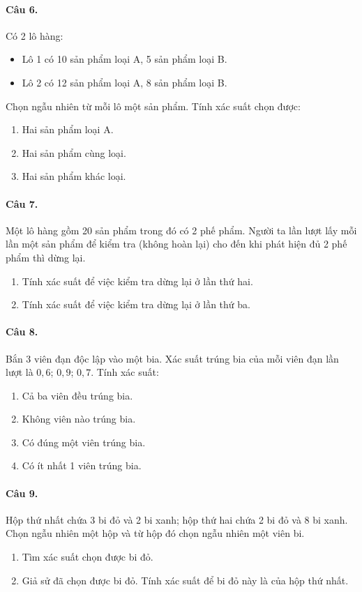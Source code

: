 \documentclass[12pt,a4paper]{article}
\theoremstyle{definition}
\begin{document}
\paragraph{Câu 6.} Có 2 lô hàng:
\begin{itemize}
    \item Lô 1 có 10 sản phẩm loại A, 5 sản phẩm loại B.
    \item Lô 2 có 12 sản phẩm loại A, 8 sản phẩm loại B.
\end{itemize}
Chọn ngẫu nhiên từ mỗi lô một sản phẩm. Tính xác suất chọn được:
\begin{enumerate}[label=\arabic*.]
    \item Hai sản phẩm loại A.
    \item Hai sản phẩm cùng loại.
    \item Hai sản phẩm khác loại.
\end{enumerate}

\paragraph{Câu 7.} Một lô hàng gồm 20 sản phẩm trong đó có 2 phế phẩm. Người ta lần lượt lấy mỗi lần một sản phẩm để kiểm tra (không hoàn lại) cho đến khi phát hiện đủ 2 phế phẩm thì dừng lại.
\begin{enumerate}[label=\alph*/]
    \item Tính xác suất để việc kiểm tra dừng lại ở lần thứ hai.
    \item Tính xác suất để việc kiểm tra dừng lại ở lần thứ ba.
\end{enumerate}

\paragraph{Câu 8.} Bắn 3 viên đạn độc lập vào một bia. Xác suất trúng bia của mỗi viên đạn lần lượt là $0{,}6$; $0{,}9$; $0{,}7$. Tính xác suất:
\begin{enumerate}[label=\alph*/]
    \item Cả ba viên đều trúng bia.
    \item Không viên nào trúng bia.
    \item Có đúng một viên trúng bia.
    \item Có ít nhất 1 viên trúng bia.
\end{enumerate}

\paragraph{Câu 9.} Hộp thứ nhất chứa 3 bi đỏ và 2 bi xanh; hộp thứ hai chứa 2 bi đỏ và 8 bi xanh. Chọn ngẫu nhiên một hộp và từ hộp đó chọn ngẫu nhiên một viên bi.
\begin{enumerate}[label=\arabic*.]
    \item Tìm xác suất chọn được bi đỏ.
    \item Giả sử đã chọn được bi đỏ. Tính xác suất để bi đỏ này là của hộp thứ nhất.
\end{enumerate}
\end{document}
